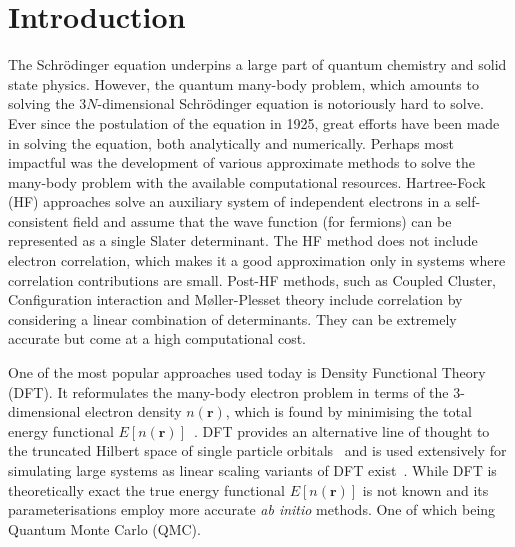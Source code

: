\documentclass[final,3p,times,twocolumn]{elsarticle}
\begin{document}
	
	\tableofcontents
	
	\section{Introduction}
	\label{sec:intro}
	The Schr{\"o}dinger equation underpins a large part of quantum chemistry and solid state physics. However, the quantum many-body problem, which amounts to solving the $3N$-dimensional Schr\"odinger equation is notoriously hard to solve. Ever since the postulation of the equation in 1925, great efforts have been made in solving the equation, both analytically and numerically. Perhaps most impactful was the development of various approximate methods to solve the many-body problem with the available computational resources. Hartree-Fock (HF) approaches solve an auxiliary system of independent electrons in a self-consistent field and assume that the wave function (for fermions) can be represented as a single Slater determinant. The HF method does not include electron correlation, which makes it a good approximation only in systems where correlation contributions are small. Post-HF methods, such as Coupled Cluster, Configuration interaction and M\o ller-Plesset theory include correlation by considering a linear combination of determinants. They can be extremely accurate but come at a high computational cost. 

	One of the most popular approaches used today is Density Functional Theory (DFT). It reformulates the many-body electron problem in terms of the $3$-dimensional electron density $n(\mathbf{r})$, which is found by minimising the total energy functional $E[n(\mathbf{r})]$~\cite{hohenberg1964inhomogeneous}. DFT provides an alternative line of thought to the truncated Hilbert space of single particle orbitals~\cite{kohn1999nobel} and is used extensively for simulating large systems as linear scaling variants of DFT exist~\cite{skylaris2005introducing}. 
	While DFT is theoretically exact the true energy functional $E[n(\mathbf{r})]$ is not known and its parameterisations employ more accurate \emph{ab initio} methods. One of which being Quantum Monte Carlo (QMC).
	
\end{document}
